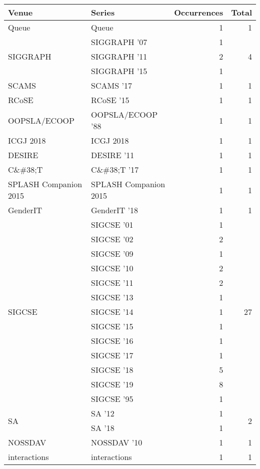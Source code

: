 \begin{table*}[t]
\begin{tabular}{llrr}
Venue & Series & Occurrences & Total\\\hline
\multirow{1}{*}{Queue} & Queue & 1 & \multirow{1}{*}{1}\\
\multirow{3}{*}{SIGGRAPH } & SIGGRAPH '07 & 1 & \multirow{3}{*}{4}\\
& SIGGRAPH '11 & 2 &\\
& SIGGRAPH '15 & 1 &\\
\multirow{1}{*}{SCAMS } & SCAMS '17 & 1 & \multirow{1}{*}{1}\\
\multirow{1}{*}{RCoSE } & RCoSE '15 & 1 & \multirow{1}{*}{1}\\
\multirow{1}{*}{OOPSLA/ECOOP } & OOPSLA/ECOOP '88 & 1 & \multirow{1}{*}{1}\\
\multirow{1}{*}{ICGJ 2018} & ICGJ 2018 & 1 & \multirow{1}{*}{1}\\
\multirow{1}{*}{DESIRE } & DESIRE '11 & 1 & \multirow{1}{*}{1}\\
\multirow{1}{*}{C\&\#38;T } & C\&\#38;T '17 & 1 & \multirow{1}{*}{1}\\
\multirow{1}{*}{SPLASH Companion 2015} & SPLASH Companion 2015 & 1 & \multirow{1}{*}{1}\\
\multirow{1}{*}{GenderIT } & GenderIT '18 & 1 & \multirow{1}{*}{1}\\
\multirow{13}{*}{SIGCSE } & SIGCSE '01 & 1 & \multirow{13}{*}{27}\\
& SIGCSE '02 & 2 &\\
& SIGCSE '09 & 1 &\\
& SIGCSE '10 & 2 &\\
& SIGCSE '11 & 2 &\\
& SIGCSE '13 & 1 &\\
& SIGCSE '14 & 1 &\\
& SIGCSE '15 & 1 &\\
& SIGCSE '16 & 1 &\\
& SIGCSE '17 & 1 &\\
& SIGCSE '18 & 5 &\\
& SIGCSE '19 & 8 &\\
& SIGCSE '95 & 1 &\\
\multirow{2}{*}{SA } & SA '12 & 1 & \multirow{2}{*}{2}\\
& SA '18 & 1 &\\
\multirow{1}{*}{NOSSDAV } & NOSSDAV '10 & 1 & \multirow{1}{*}{1}\\
\multirow{1}{*}{interactions} & interactions & 1 & \multirow{1}{*}{1}\\

\end{tabular}
\end{table*}
